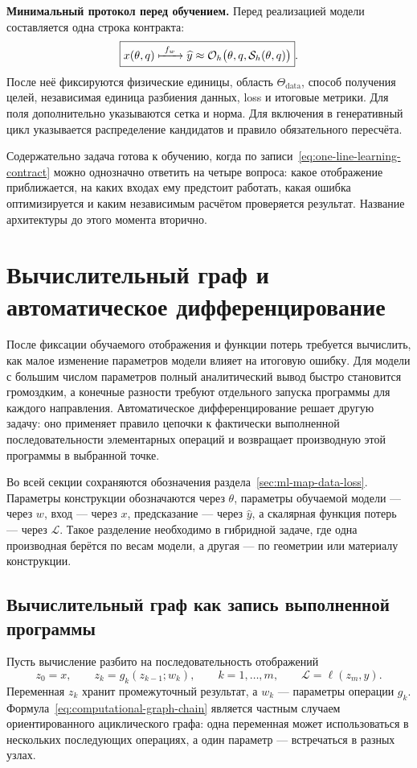\medskip
\noindent\textbf{Минимальный протокол перед обучением.}
Перед реализацией модели составляется одна строка контракта:
\begin{equation}
\label{eq:one-line-learning-contract}
 \boxed{
 x(\theta,q)
 \xmapsto{\ f_w\ }
 \widehat y
 \approx
 \mathcal O_h\bigl(\theta,q,\mathcal S_h(\theta,q)\bigr)
 }.
\end{equation}
После неё фиксируются физические единицы, область $\Theta_{\mathrm{data}}$, способ получения целей, независимая единица разбиения данных, loss и итоговые метрики. Для поля дополнительно указываются сетка и норма. Для включения в генеративный цикл указывается распределение кандидатов и правило обязательного пересчёта.

Содержательно задача готова к обучению, когда по записи~\eqref{eq:one-line-learning-contract} можно однозначно ответить на четыре вопроса: какое отображение приближается, на каких входах ему предстоит работать, какая ошибка оптимизируется и каким независимым расчётом проверяется результат. Название архитектуры до этого момента вторично.

\section{Вычислительный граф и автоматическое дифференцирование}
\label{sec:computational-graph-autodiff}
После фиксации обучаемого отображения и функции потерь требуется вычислить, как малое изменение параметров модели влияет на итоговую ошибку. Для модели с большим числом параметров полный аналитический вывод быстро становится громоздким, а конечные разности требуют отдельного запуска программы для каждого направления. Автоматическое дифференцирование решает другую задачу: оно применяет правило цепочки к фактически выполненной последовательности элементарных операций и возвращает производную этой программы в выбранной точке.

Во всей секции сохраняются обозначения раздела~\ref{sec:ml-map-data-loss}. Параметры конструкции обозначаются через $\theta$, параметры обучаемой модели --- через $w$, вход --- через $x$, предсказание --- через $\widehat y$, а скалярная функция потерь --- через $\mathcal L$. Такое разделение необходимо в гибридной задаче, где одна производная берётся по весам модели, а другая --- по геометрии или материалу конструкции.

\subsection{Вычислительный граф как запись выполненной программы}
Пусть вычисление разбито на последовательность отображений
\begin{equation}
\label{eq:computational-graph-chain}
 z_0=x,
 \qquad
 z_k=g_k(z_{k-1};w_k),
 \qquad
 k=1,\ldots,m,
 \qquad
 \mathcal L=\ell(z_m,y).
\end{equation}
Переменная $z_k$ хранит промежуточный результат, а $w_k$ --- параметры операции $g_k$. Формула~\eqref{eq:computational-graph-chain} является частным случаем ориентированного ациклического графа: одна переменная может использоваться в нескольких последующих операциях, а один параметр --- встречаться в разных узлах.

